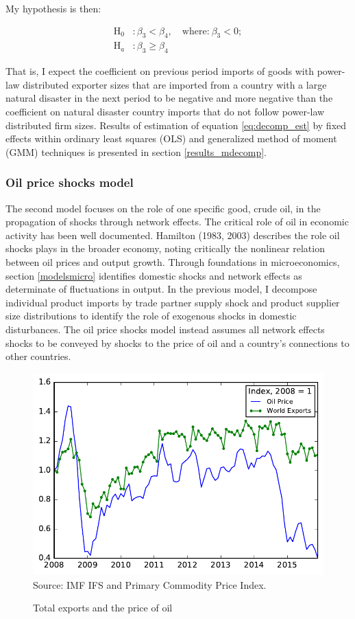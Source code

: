 \documentclass[10pt,letterpaper]{article}
\begin{document}
My hypothesis is then:

\begin{align*}
\text{H}_0 &: \beta_3 < \beta_4, \quad \text{where:} \ \beta_3 < 0; \\
\text{H}_a &: \beta_3 \geq \beta_4 
\end{align*}

That is, I expect the coefficient on previous period imports of goods with power-law distributed exporter sizes that are imported from a country with a large natural disaster in the next period to be negative and more negative than the coefficient on natural disaster country imports that do not follow power-law distributed firm sizes. Results of estimation of equation \ref{eq:decomp_est} by fixed effects within ordinary least squares (OLS) and generalized method of moment (GMM) techniques is presented in section \ref{results_mdecomp}.

\subsubsection{Oil price shocks model} \label{models-oil}
The second model focuses on the role of one specific good, crude oil, in the propagation of shocks through network effects. The critical role of oil in economic activity has been well documented. Hamilton (1983, 2003) describes the role oil shocks plays in the broader economy, noting critically the nonlinear relation between oil prices and output growth. Through foundations in microeconomics, section \ref{modelsmicro} identifies domestic shocks and network effects as determinate of fluctuations in output. In the previous model, I decompose individual product imports by trade partner supply shock and product supplier size distributions to identify the role of exogenous shocks in domestic disturbances. The oil price shocks model instead assumes all network effects shocks to be conveyed by shocks to the price of oil and a country's connections to other countries.


\begin{figure}
  \caption{Total exports and the price of oil}
  \centering
\includegraphics[scale=0.8]{plots/wti_ix.pdf} \\
\footnotesize{Source: IMF IFS and Primary Commodity Price Index.}\\
\end{figure}
\end{document}
